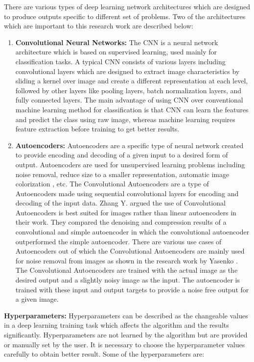\par
There are various types of deep learning network architectures which are designed to produce outputs specific to different set of problems. Two of the architectures which are important to this research work are described below:
\begin{enumerate}
    \item \textbf{Convolutional Neural Networks:} The CNN is a neural network architecture which is based on supervised learning, used mainly for classification tasks. A typical CNN consists of various layers including convolutional layers which are designed to extract image characteristics by sliding a kernel over image and create a different representation at each level, followed by other layers like pooling layers, batch normalization layers, and fully connected layers. The main advantage of using CNN over conventional machine learning method for classification is that CNN can learn the features and predict the class using raw image, whereas machine learning requires feature extraction before training to get better results.
    \item \textbf{Autoencoders:} Autoencoders \cite{Bank2020} are a specific type of neural network created to provide encoding and decoding of a given input to a desired form of output. Autoencoders are used for unsupervised learning problems including noise removal, reduce size to a smaller representation, automatic image colorization \cite{Singh2022}, etc. The Convolutional Autoencoders are a type of Autoencoders made using sequential convolutional layers for encoding and decoding of the input data. Zhang Y. \cite{Zhang} argued the use of Convolutional Autoencoders is best suited for images rather than linear autoencoders in their work. They compared the denoising and compression results of a convolutional and simple autoencoder in which the convolutional autoencoder outperformed the simple autoencoder. There are various use cases of Autoencoders out of which the Convolutional Autoencoders are mainly used for noise removal from images as shown in the research work by Yasenko \cite{DESSERT2020}. The Convolutional Autoencoders are trained with the actual image as the desired output and a slightly noisy image as the input. The autoencoder is trained with these input and output targets to provide a noise free output for a given image.
\end{enumerate}
\textbf{Hyperparameters:} Hyperparameters can be described as the changeable values in a deep learning training task which affects the algorithm and the results significantly. Hyperparameters are not learned by the algorithm but are provided or manually set by the user. It is necessary to choose the hyperparameter values carefully to obtain better result. Some of the hyperparameters are:
